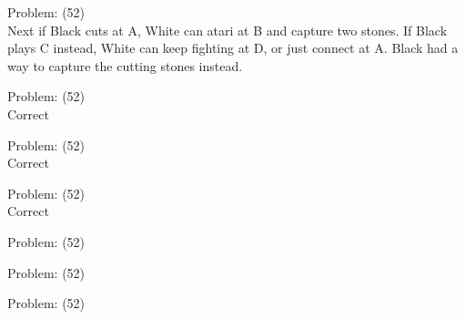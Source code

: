\documentclass[11pt]{article}
\begin{document}
\begin{minipage}[t]{0.5\textwidth}
  {\centering
  
Problem: (52)\\
Next if Black cuts at A, White can atari at B and capture two stones. If Black plays C instead, White can keep fighting at D, or just connect at A. Black had a way to capture the cutting stones instead.\\
  }
\end{minipage}
\begin{minipage}[t]{0.5\textwidth}
  {\centering
  
Problem: (52)\\
Correct\\
  }
\end{minipage}
\begin{minipage}[t]{0.5\textwidth}
  {\centering
  
Problem: (52)\\
Correct\\
  }
\end{minipage}
\begin{minipage}[t]{0.5\textwidth}
  {\centering
  
Problem: (52)\\
Correct\\
  }
\end{minipage}
\begin{minipage}[t]{0.5\textwidth}
  {\centering
  
Problem: (52)\\
  }
\end{minipage}
\begin{minipage}[t]{0.5\textwidth}
  {\centering
  
Problem: (52)\\
  }
\end{minipage}
\begin{minipage}[t]{0.5\textwidth}
  {\centering
  
Problem: (52)\\
  }
\end{minipage}
\end{document}
